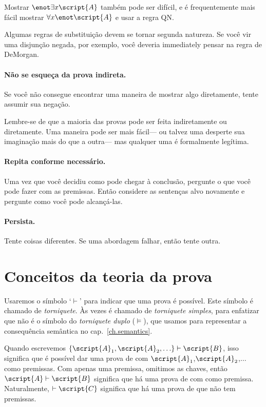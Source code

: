 Mostrar $\enot \exists x\script{A}$ também pode ser difícil, e é frequentemente mais fácil mostrar  $\forall x\enot \script{A}$ e usar a regra QN.

Algumas regras de substituição devem se tornar segunda natureza. Se você vir uma disjunção negada, por exemplo, você deveria immediately pensar na regra de DeMorgan.

\paragraph{Não se esqueça da prova indireta.}
Se você não consegue encontrar uma maneira de mostrar algo diretamente, tente assumir sua negação.

Lembre-se de que a maioria das provas pode ser feita indiretamente ou diretamente. Uma maneira pode ser mais fácil--- ou talvez uma desperte sua imaginação mais do que a outra--- mas qualquer uma é formalmente legítima.

\paragraph{Repita conforme necessário.} Uma vez que você decidiu como pode chegar à conclusão, pergunte o que você pode fazer com as premissas. Então considere as sentenças alvo novamente e pergunte como você pode alcançá-las.

\paragraph{Persista.}
Tente coisas diferentes. Se uma abordagem falhar, então tente outra.




\section{Conceitos da teoria da prova}

Usaremos o símbolo `$\vdash$' para indicar que uma prova é possível. Este símbolo é chamado de \emph{torniquete}. Às vezes é chamado de \emph{torniquete simples}, para enfatizar que não é o símbolo do \emph{torniquete duplo} ($\models$), que usamos para representar a consequência semântica no cap.~\ref{ch.semantics}.

Quando escrevemos $\{\script{A}_1,\script{A}_2,\ldots\}\vdash\script{B}$, isso significa que é possível dar uma prova de  com $\script{A}_1$,$\script{A}_2$,$\ldots$ como premissas. Com apenas uma premissa, omitimos as chaves, então $\script{A}\vdash\script{B}$ significa que há uma prova de  com  como premissa. Naturalmente, $\vdash\script{C}$ significa que há uma prova de  que não tem premissas.

